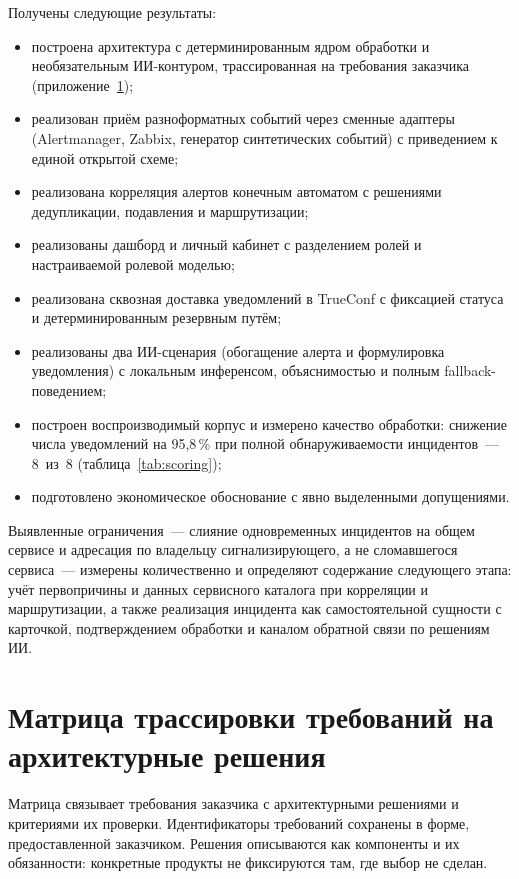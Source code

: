 \documentclass[utf8x, 12pt]{G7-32} %
\begin{document}
Получены следующие результаты:
\begin{itemize}
    \item построена архитектура с детерминированным ядром обработки и
          необязательным ИИ-контуром, трассированная на требования заказчика
          (приложение~\ref{app:traceability});
    \item реализован приём разноформатных событий через сменные адаптеры
          (Alertmanager, Zabbix, генератор синтетических событий) с приведением
          к единой открытой схеме;
    \item реализована корреляция алертов конечным автоматом с решениями
          дедупликации, подавления и маршрутизации;
    \item реализованы дашборд и личный кабинет с разделением ролей и
          настраиваемой ролевой моделью;
    \item реализована сквозная доставка уведомлений в TrueConf с фиксацией
          статуса и детерминированным резервным путём;
    \item реализованы два ИИ-сценария (обогащение алерта и формулировка
          уведомления) с локальным инференсом, объяснимостью и полным
          fallback-поведением;
    \item построен воспроизводимый корпус и измерено качество обработки:
          снижение числа уведомлений на 95,8\,\% при полной обнаруживаемости
          инцидентов~--- 8~из~8 (таблица~\ref{tab:scoring});
    \item подготовлено экономическое обоснование с явно выделенными
          допущениями.
\end{itemize}

Выявленные ограничения~--- слияние одновременных инцидентов на общем сервисе
и адресация по владельцу сигнализирующего, а не сломавшегося сервиса~---
измерены количественно и определяют содержание следующего этапа: учёт
первопричины и данных сервисного каталога при корреляции и маршрутизации,
а также реализация инцидента как самостоятельной сущности с карточкой,
подтверждением обработки и каналом обратной связи по решениям ИИ.

\nocite{*}


\appendix   %

\chapter{Матрица трассировки требований на архитектурные решения}
\label{app:traceability}
Матрица связывает требования заказчика с архитектурными решениями и критериями
их проверки. Идентификаторы требований сохранены в форме, предоставленной
заказчиком. Решения описываются как компоненты и их обязанности: конкретные
продукты не фиксируются там, где выбор не сделан.
\end{document}
